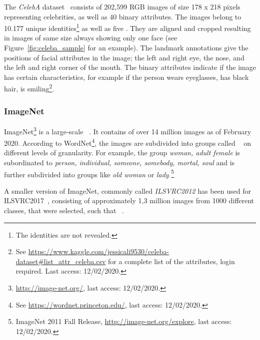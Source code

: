 The \textit{CelebA} dataset~\citep{liu2015faceattributes} consists of 202,599 RGB images of size 178 x 218 pixels representing celebrities, as well as 40 binary attributes.
The images belong to 10.177 unique identities\footnote{The identities are not revealed.} as well as five .
They are aligned and cropped resulting in images of same size always showing only one face (see Figure~\ref{fig:celeba_sample} for an example).
The landmark annotations give the positions of facial attributes in the image; the left and right eye, the nose, and the left and right corner of the mouth.
The binary attributes indicate if the image has certain characteristics, for example if the person wears eyeglasses, has black hair, is smiling\footnote{See \href{https://www.kaggle.com/jessicali9530/celeba-dataset\#list\_attr\_celeba.csv}{https://www.kaggle.com/jessicali9530/celeba-dataset\#list\_attr\_celeba.csv} for a complete list of the attributes, login required. Last access: 12/02/2020.}.

\subsubsection{ImageNet}\label{ssec:imagenet}

ImageNet\footnote{\href{http://image-net.org/}{http://image-net.org/}, last access: 12/02/2020.} is a large-scale ~\citep{imagenet_cvpr09}.
It contains of over 14 million images as of February 2020.
According to WordNet\footnote{See \href{https://wordnet.princeton.edu/}{https://wordnet.princeton.edu/}, last access: 12/02/2020.}, the images are subdivided into groups called ~\citep{imagenet_cvpr09} on different levels of granularity.
For example, the group \textit{woman, adult female} is subordinated to \textit{person, individual, someone, somebody, mortal, soul} and is further subdivided into groups like \textit{old woman} or \textit{lady} \footnote{ImageNet 2011 Fall Release, \href{http://image-net.org/explore}{http://image-net.org/explore}, last access: 12/02/2020.}

A smaller version of ImageNet, commonly called \textit{ILSVRC2012} has been used for \ac{ILSVRC2017}~\citep{ILSVRC15}, consisting of approximately 1,3 million images from 1000 different classes, that were selected, such that ~\citep{imagenet_cvpr09}.


